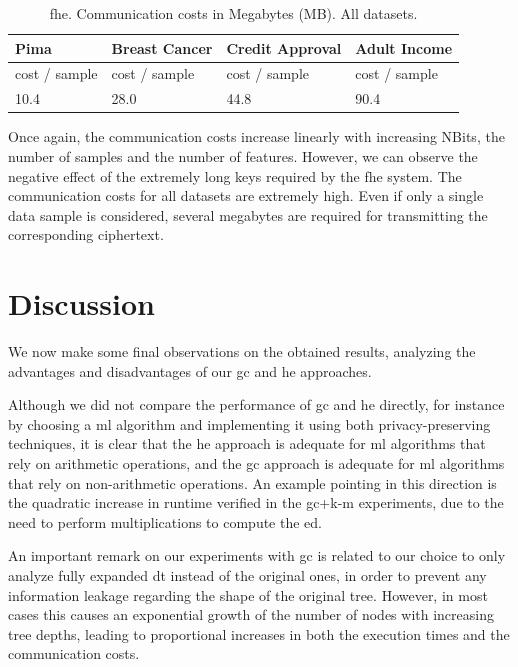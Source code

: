 \begin{table}[htp]
\centering
\caption{\acs{fhe}. Communication costs in Megabytes (MB). All datasets.}
\label{table:FHECommCost}
\vspace*{0.2cm}
\begin{tabular}{|l|l|l|l|}
\hline
\textbf{Pima}          & \textbf{Breast Cancer} & \textbf{Credit Approval} & \textbf{Adult Income}   \\ \hline
cost / sample & cost / sample & cost / sample   & cost / sample  \\ \hline
10.4   & 28.0  & 44.8  & 90.4   \\ \hline
\end{tabular}
\end{table}

Once again, the communication costs increase linearly with increasing NBits, the number of samples and the number of features. However, we can observe the negative effect of the extremely long keys required by the \ac{fhe} system. The communication costs for all datasets are extremely high. Even if only a single data sample is considered, several megabytes are required for transmitting the corresponding ciphertext.



\section{Discussion}
\label{sec:ExperimentalResultsConclusion}


We now make some final observations on the obtained results, analyzing the advantages and disadvantages of our \ac{gc} and \ac{he} approaches.

Although we did not compare the performance of \ac{gc} and \ac{he} directly, for instance by choosing a \ac{ml} algorithm and implementing it using both privacy-preserving techniques, it is clear that the \ac{he} approach is adequate for \ac{ml} algorithms that rely on arithmetic operations, and the \ac{gc} approach is adequate for \ac{ml} algorithms that rely on non-arithmetic operations. An example pointing in this direction is the quadratic increase in runtime verified in the \ac{gc}+\ac{k-m} experiments, due to the need to perform multiplications to compute the \ac{ed}.

An important remark on our experiments with \ac{gc} is related to our choice to only analyze fully expanded \ac{dt} instead of the original ones, in order to prevent any information leakage regarding the shape of the original tree. However, in most cases this causes an exponential growth of the number of nodes with increasing tree depths, leading to proportional increases in both the execution times and the communication costs.

